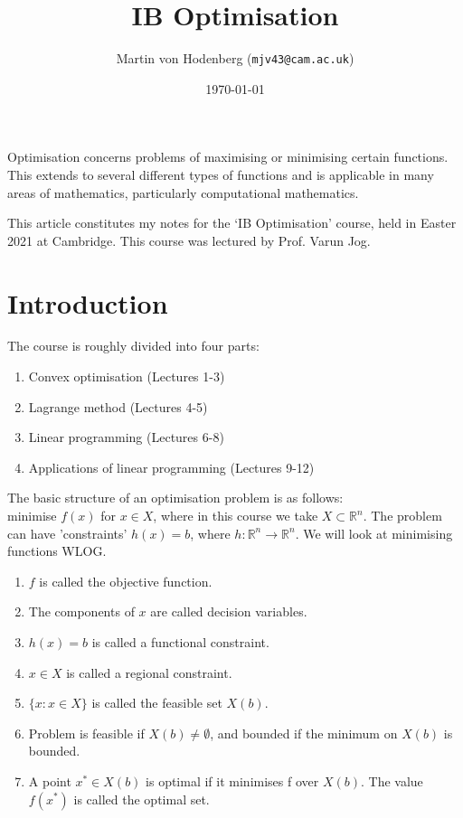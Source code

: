 \documentclass[a4paper]{scrartcl}
\title{IB Optimisation}
\author{Martin von Hodenberg (\texttt{mjv43@cam.ac.uk})}
\date{\today}
\begin{document}
\maketitle

Optimisation concerns problems of maximising or minimising certain functions. This extends to several different types of functions and is applicable in many areas of mathematics, particularly computational mathematics.

This article constitutes my notes for the `IB Optimisation' course, held in Easter 2021 at Cambridge. This course was lectured by Prof. Varun Jog.

\tableofcontents
\newpage 

\section{Introduction}

The course is roughly divided into four parts:
\begin{enumerate}
	\item Convex optimisation (Lectures 1-3)
	\item Lagrange method (Lectures 4-5)
	\item Linear programming (Lectures 6-8)
	\item Applications of linear programming (Lectures 9-12)
\end{enumerate}

\begin{definition}
	The basic structure of an optimisation problem is as follows:\\
	minimise $f(x)$ for $x \in X$, where in this course we take $X \subset \mathbb{R}^n$. The problem can have 'constraints' $h(x)=b$, where $h:\mathbb{R}^n \to \mathbb{R}^n$. We will look at minimising functions WLOG.
	
	\begin{enumerate}
		\item $f$ is called the objective function.
		\item The components of $x$ are called decision variables.
		\item $h(x)=b$ is called a functional constraint.
		\item $x \in X$ is called a regional constraint.
		\item $\{x: x \in X\}$ is called the feasible set $X (b) $.
		\item Problem is feasible if $X(b)\neq \emptyset$, and bounded if the minimum on $X(b)$ is bounded.
		\item A point $x^* \in X(b)$ is optimal if it minimises f over $X(b)$. The value $f(x^*)$ is called the optimal set. 
	\end{enumerate}
	
\end{definition}
\end{document}
